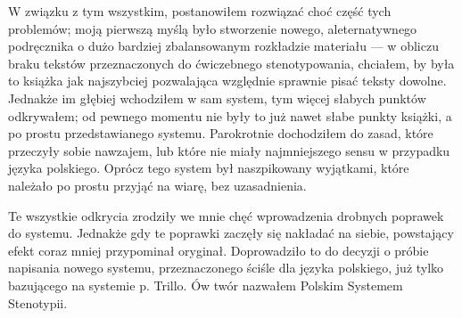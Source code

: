 \documentclass[12p, oneside]{book}
\begin{document}
W związku z tym wszystkim, postanowiłem rozwiązać choć część tych problemów;
moją pierwszą myślą było stworzenie nowego, aleternatywnego podręcznika o dużo
bardziej zbalansowanym rozkładzie materiału --- w obliczu braku tekstów
przeznaczonych do ćwiczebnego stenotypowania, chciałem, by była to książka jak
najszybciej pozwalająca względnie sprawnie pisać teksty dowolne. Jednakże im
głębiej wchodziłem w sam system, tym więcej słabych punktów odkrywałem; od
pewnego momentu nie były to już nawet słabe punkty książki, a po prostu
przedstawianego systemu. Parokrotnie dochodziłem do zasad, które przeczyły sobie
nawzajem, lub które nie miały najmniejszego sensu w przypadku języka polskiego.
Oprócz tego system był naszpikowany wyjątkami, które należało po prostu przyjąć
na wiarę, bez uzasadnienia.

Te wszystkie odkrycia zrodziły we mnie chęć wprowadzenia drobnych poprawek do
systemu. Jednakże gdy te poprawki zaczęły się nakładać na siebie, powstający
efekt coraz mniej przypominał oryginał. Doprowadziło to do decyzji o próbie
napisania nowego systemu, przeznaczonego ściśle dla języka polskiego, już tylko
bazującego na systemie p. Trillo. Ów twór nazwałem Polskim Systemem Stenotypii.
\end{document}
